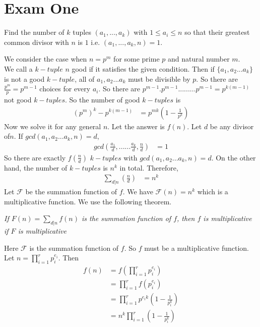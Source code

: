 \documentclass{subfile}
\begin{document}
	
	\section{Exam One}
	
	\begin{problem}
		Find the number of $k$ tuples $(a_1,...,a_k)$ with $1\leq a_i\leq n$ so that their greatest common divisor with $n$ is $1$ i.e. $(a_1,...,a_k,n)=1$.
	\end{problem}
	
	\begin{solution}
		We consider the case when $n=p^m$ for some prime $p$ and natural number $m$.\\
		We call a $k-tuple$ $n$ good if it satisfies the given condition. Then if $\{a_1,a_2...a_{k}\}$ is not a good $k-tuple$, all of $a_1,a_2...a_{k}$ must be divisible by $p$. So there are $\frac{p^m}{p}=p^{m-1}$ choices for every $a_i$. So there are $p^{m-1}.p^{m-1}.........p^{m-1}=p^{k(m-1)}$ not good $k-tuples$. So the number of good $k-tuples$ is
			\begin{align*}
				(p^m)^k-p^{k(m-1)} & =p^{mk}(1-\frac{1}{p^k})
			\end{align*}
		Now we solve it for any general $n$. Let the answer is $f(n)$.
		Let $d$ be any divisor of$n$. 
		If $gcd(a_1,a_2...a_{k},n)=d$,
			\begin{align*}
				gcd\left(\frac{a_1}{d},......\frac{a_k}{d},\frac{n}{d}\right) & =1
			\end{align*}
		So there are exactly $f(\frac{n}{d})$ $k-tuples$ with $gcd(a_1,a_2...a_{k},n)=d$. On the other hand, the number of $k-tuples$ is $n^k$ in total. Therefore,
			\begin{align*}
				\sum_{d|n}\left(\frac{n}{d}\right)& =n^k
			\end{align*}
		Let $\mathcal{F}$ be the summation function of $f$. We have $\mathcal{F}(n)=n^k$ which is a multiplicative function. We use the following theorem.
			\begin{theorem}\slshape
				If $F(n)=\sum\limits_{d|n}{}f(n)$ is the summation function of $f$, then $f$ is multiplicative if $F$ is multiplicative
			\end{theorem}
		Here $\mathcal{F}$ is the summation function of $f$. So $f$ must be a multiplicative function. Let $n=\prod\limits_{i=1}^{r}p_i^{e_i}$. Then 
			\begin{align*}
				f(n) & =f\left(\prod\limits_{i=1}^{r}p_i^{e_i}\right)\\
				& =\prod\limits_{i=1}^{r}f(p_i^{e_i})\\
				& =\prod\limits_{i=1}^{r}p^{e_ik}\left(1-\frac{1}{p_i^k}\right)\\
				& =n^k\prod\limits_{i=1}^{r}\left(1-\frac{1}{p_i^k}\right)
			\end{align*}
		
	\end{solution}
	
\end{document}

